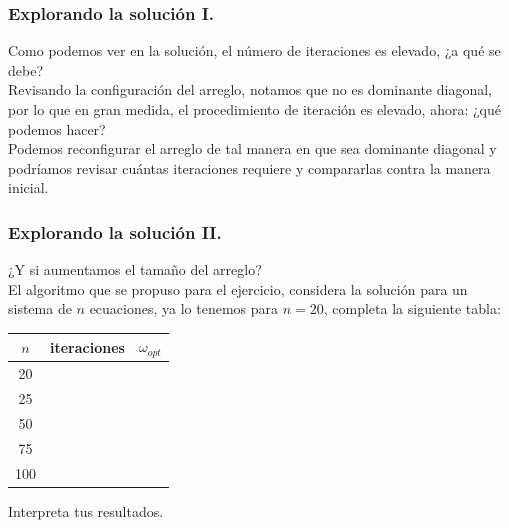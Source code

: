 \begin{frame}
\frametitle{Explorando la solución I.}
Como podemos ver en la solución, el número de iteraciones es elevado, ¿a qué se debe?
\\
\medskip
Revisando la configuración del arreglo, notamos que no es dominante diagonal, por lo que en gran medida, el procedimiento de iteración es elevado, ahora: ¿qué podemos hacer?
\\
\medskip
Podemos reconfigurar el arreglo de tal manera en que sea dominante diagonal y podríamos revisar cuántas iteraciones requiere y compararlas contra la manera inicial.
\end{frame}
\begin{frame}
\frametitle{Explorando la solución II.}
¿Y si aumentamos el tamaño del arreglo?
\\
\medskip
El algoritmo que se propuso para el ejercicio, considera la solución para un sistema de $n$ ecuaciones, ya lo tenemos para $n=20$, completa la siguiente tabla:
\begin{center}
\begin{tabular}{c | c | c }
\hline
$n$ & iteraciones & $\omega_{opt}$ \\ \hline
20 & & \\ \hline
25 & & \\ \hline
50 & & \\ \hline
75 & & \\ \hline
100 & & \\ \hline
\end{tabular}
\end{center}
Interpreta tus resultados.
\end{frame}
